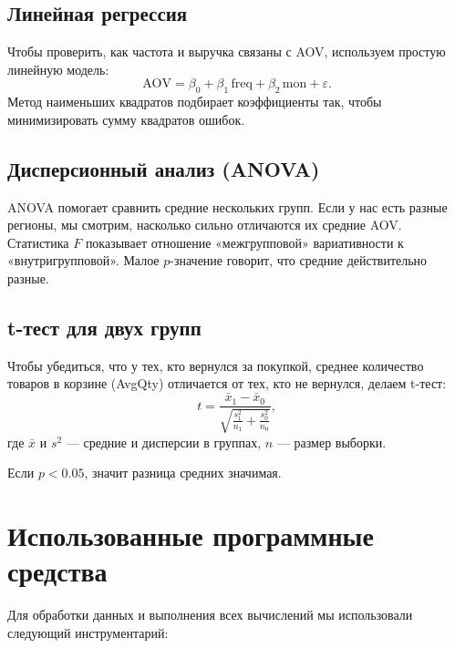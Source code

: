 \documentclass[a4paper]{article}
\begin{document}
\subsection{Линейная регрессия}
Чтобы проверить, как частота и выручка связаны с AOV, используем простую линейную модель:
\[
  \text{AOV} = \beta_0 + \beta_1\,\text{freq} + \beta_2\,\text{mon} + \varepsilon.
\]
Метод наименьших квадратов подбирает коэффициенты так, чтобы минимизировать сумму квадратов ошибок.

\subsection{Дисперсионный анализ (ANOVA)}
ANOVA помогает сравнить средние нескольких групп. Если у нас есть разные регионы, мы смотрим, насколько сильно отличаются их средние AOV.  
Статистика \(F\) показывает отношение «межгрупповой» вариативности к «внутригрупповой». Малое \(p\)-значение говорит, что средние действительно разные.

\subsection{t-тест для двух групп}
Чтобы убедиться, что у тех, кто вернулся за покупкой, среднее количество товаров в корзине (AvgQty) отличается от тех, кто не вернулся, делаем t-тест:
\[
  t = \frac{\bar x_1 - \bar x_0}{\sqrt{\frac{s_1^2}{n_1} + \frac{s_0^2}{n_0}}},
\]
где \(\bar x\) и \(s^2\) — средние и дисперсии в группах, \(n\) — размер выборки.  

Если \(p<0.05\), значит разница средних значимая.

\section{Использованные программные средства}

Для обработки данных и выполнения всех вычислений мы использовали следующий инструментарий:
\end{document}
